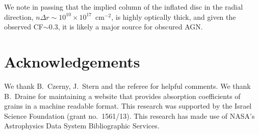 \documentclass[a4paper,fleqn,usenatbib]{mnras}
\begin{document}
We note in passing that the implied column of the inflated disc in the radial direction,
$n\Delta r\sim 10^{10}\times 10^{17}$~cm$^{-2}$, is highly optically thick, and given the
observed CF$\sim 0.3$, it is likely a major source for obscured AGN.
	
	
	
	
	
\section*{Acknowledgements}
	
We thank B.\ Czerny, J.\ Stern and the referee for helpful comments. We thank B.\ Draine for maintaining a website that provides absorption coefficients of grains in a machine readable format. This research was supported by the Israel Science Foundation (grant no.\ 1561/13).
This research has made use of NASA's Astrophysics Data System Bibliographic Services.
	
\end{document}
